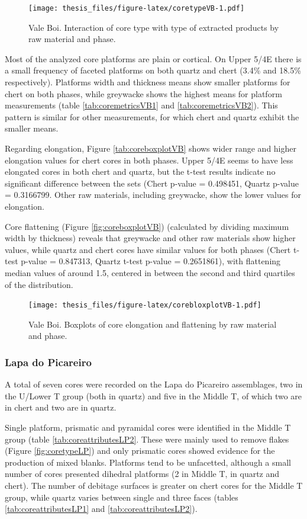 \documentclass[12pt,twoside]{reedthesis}
\begin{document}
\begin{figure}
\centering
\texttt{[image: thesis\_files/figure-latex/coretypeVB-1.pdf]}
\caption{\label{fig:coretypeVB}Vale Boi. Interaction of core type with type of extracted products by raw material and phase.}
\end{figure}
Most of the analyzed core platforms are plain or cortical. On Upper 5/4E there is a small frequency of faceted platforms on both quartz and chert (3.4\% and 18.5\% respectively). Platforms width and thickness means show smaller platforms for chert on both phases, while greywacke shows the highest means for platform measurements (table \ref{tab:coremetricsVB1} and \ref{tab:coremetricsVB2}). This pattern is similar for other measurements, for which chert and quartz exhibit the smaller means.

Regarding elongation, Figure \ref{tab:coreboxplotVB} shows wider range and higher elongation values for chert cores in both phases. Upper 5/4E seems to have less elongated cores in both chert and quartz, but the t-test results indicate no significant difference between the sets (Chert p-value = 0.498451, Quartz p-value = 0.3166799. Other raw materials, including greywacke, show the lower values for elongation.

Core flattening (Figure \ref{fig:coreboxplotVB}) (calculated by dividing maximum width by thickness) reveals that greywacke and other raw materials show higher values, while quartz and chert cores have similar values for both phases (Chert t-test p-value = 0.847313, Quartz t-test p-value = 0.2651861), with flattening median values of around 1.5, centered in between the second and third quartiles of the distribution.
\begin{figure}
\centering
\texttt{[image: thesis\_files/figure-latex/corebloxplotVB-1.pdf]}
\caption{\label{fig:corebloxplotVB}Vale Boi. Boxplots of core elongation and flattening by raw material and phase.}
\end{figure}
\hypertarget{lapa-do-picareiro-4}{%
\subsubsection{Lapa do Picareiro}\label{lapa-do-picareiro-4}}

A total of seven cores were recorded on the Lapa do Picareiro assemblages, two in the U/Lower T group (both in quartz) and five in the Middle T, of which two are in chert and two are in quartz.

Single platform, prismatic and pyramidal cores were identified in the Middle T group (table \ref{tab:coreattributesLP2}. These were mainly used to remove flakes (Figure \ref{fig:coretypeLP}) and only prismatic cores showed evidence for the production of mixed blanks. Platforms tend to be unfacetted, although a small number of cores presented dihedral platforms (2 in Middle T, in quartz and chert). The number of debitage surfaces is greater on chert cores for the Middle T group, while quartz varies between single and three faces (tables \ref{tab:coreattributesLP1} and \ref{tab:coreattributesLP2}).
\end{document}
